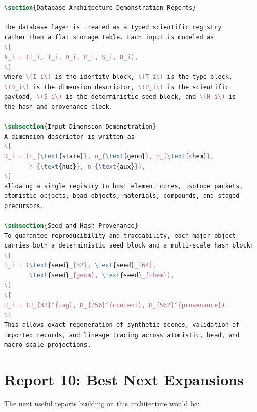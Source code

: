 \documentclass[11pt, a4paper, oneside]{article}
\begin{document}
\begin{lstlisting}[language=TeX, caption={Embeddable \LaTeX{} subsection starter}]
\section{Database Architecture Demonstration Reports}

The database layer is treated as a typed scientific registry
rather than a flat storage table. Each input is modeled as
\[
X_i = (I_i, T_i, D_i, P_i, S_i, H_i),
\]
where \(I_i\) is the identity block, \(T_i\) is the type block,
\(D_i\) is the dimension descriptor, \(P_i\) is the scientific
payload, \(S_i\) is the deterministic seed block, and \(H_i\) is
the hash and provenance block.

\subsection{Input Dimension Demonstration}
A dimension descriptor is written as
\[
D_i = (n_{\text{state}}, n_{\text{geom}}, n_{\text{chem}},
       n_{\text{nuc}}, n_{\text{aux}}),
\]
allowing a single registry to host element cores, isotope packets,
atomistic objects, bead objects, materials, compounds, and staged
precursors.

\subsection{Seed and Hash Provenance}
To guarantee reproducibility and traceability, each major object
carries both a deterministic seed block and a multi-scale hash block:
\[
S_i = (\text{seed}_{32}, \text{seed}_{64},
       \text{seed}_{geom}, \text{seed}_{chem}),
\]
\[
H_i = (H_{32}^{tag}, H_{256}^{content}, H_{562}^{provenance}).
\]
This allows exact regeneration of synthetic scenes, validation of
imported records, and lineage tracing across atomistic, bead, and
macro-scale projections.
\end{lstlisting}


\section{Report 10: Best Next Expansions}
\label{sec:report10}

The next useful reports building on this architecture would be:
\end{document}
